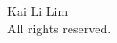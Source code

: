 
\begin{dedication} 
	\vspace*{\fill}
	\flushleft
	\textcopyright \the\year \hspace{3pt} Kai Li Lim\\
	All rights reserved.
\end{dedication}


